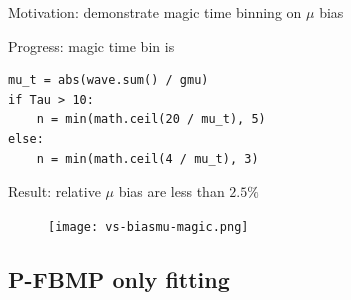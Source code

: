 \documentclass[notitlepage]{article}
\begin{document}
Motivation: demonstrate magic time binning on $\mu$ bias

Progress: magic time bin is
\begin{lstlisting}
mu_t = abs(wave.sum() / gmu)
if Tau > 10:
    n = min(math.ceil(20 / mu_t), 5)
else:
    n = min(math.ceil(4 / mu_t), 3)
\end{lstlisting}

Result: relative $\mu$ bias are less than $2.5\%$

\begin{figure}[H]
    \centering
    \texttt{[image: vs-biasmu-magic.png]}
\end{figure}

\subsection{P-FBMP only fitting}
\end{document}
